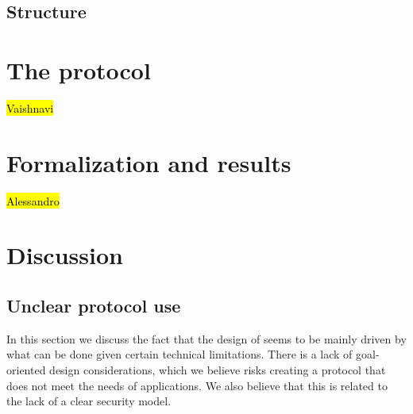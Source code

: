 \documentclass[runningheads,draft,x11names]{llncs}
\begin{document}
\subsection{Structure}
\label{sec:structure}
\section{The \mEdhoc{} protocol}
\label{sec:edhoc}
\hl{Vaishnavi}


\section{Formalization and results}
\label{sec:formalization}
\hl{Alessandro}


\section{Discussion}
\label{sec:discussion}
\subsection{Unclear protocol use}
\label{sec:unclearProtocolUse}
In this section we discuss the fact that the design of \mEdhoc{} seems to be
mainly driven by what can be done given certain technical limitations.
%
There is a lack of goal-oriented design considerations, which we believe risks
creating a protocol that does not meet the needs of applications.
%
We also believe that this is related to the lack of a clear security model.
%
\end{document}
